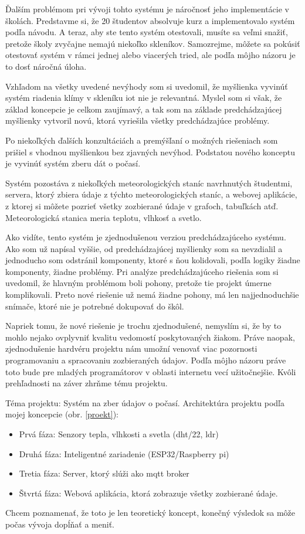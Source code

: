Ďalším problémom pri vývoji tohto systému je náročnosť jeho implementácie v školách. Predstavme si, že 20 študentov absolvuje kurz a implementovalo systém podľa návodu. A teraz, aby ste tento systém otestovali, musíte sa veľmi snažiť, pretože školy zvyčajne nemajú niekoľko skleníkov. Samozrejme, môžete sa pokúsiť otestovať systém v rámci jednej alebo viacerých tried, ale podľa môjho názoru je to dosť náročná úloha. 

Vzhľadom na všetky uvedené nevýhody som si uvedomil, že myšlienka vyvinúť systém riadenia klímy v skleníku \gls{iot} nie je relevantná. Myslel som si však, že základ koncepcie je celkom zaujímavý, a tak som na základe predchádzajúcej myšlienky vytvoril novú, ktorá vyriešila všetky predchádzajúce problémy. 

Po niekoľkých ďalších konzultáciách a premýšľaní o možných riešeniach som prišiel s vhodnou myšlienkou bez zjavných nevýhod. Podstatou nového konceptu je vyvinúť systém zberu dát o počasí.

Systém pozostáva z niekoľkých meteorologických staníc navrhnutých študentmi, servera, ktorý zbiera údaje z týchto meteorologických staníc, a webovej aplikácie, z ktorej si môžete pozrieť všetky zozbierané údaje v grafoch, tabuľkách atď. Meteorologická stanica meria teplotu, vlhkosť a svetlo.

Ako vidíte, tento systém je zjednodušenou verziou predchádzajúceho systému. Ako som už napísal vyššie, od predchádzajúcej myšlienky som sa nevzdialil a jednoducho som odstránil komponenty, ktoré s ňou kolidovali, podľa logiky žiadne komponenty, žiadne problémy. Pri analýze predchádzajúceho riešenia som si uvedomil, že hlavným problémom boli pohony, pretože tie projekt úmerne komplikovali. Preto nové riešenie už nemá žiadne pohony, má len najjednoduchšie snímače, ktoré nie je potrebné dokupovať do škôl. 

Napriek tomu, že nové riešenie je trochu zjednodušené, nemyslím si, že by to mohlo nejako ovplyvniť kvalitu vedomostí poskytovaných žiakom. Práve naopak, zjednodušenie hardvéru projektu nám umožní venovať viac pozornosti programovaniu a spracovaniu zozbieraných údajov. Podľa môjho názoru práve toto bude pre mladých programátorov v oblasti internetu vecí užitočnejšie. 
Kvôli prehľadnosti na záver zhrňme tému projektu.

Téma projektu:  Systém na zber údajov o počasí.
Architektúra projektu podľa mojej koncepcie (obr. \ref{proekt}):
\begin{itemize}
    \item Prvá fáza: Senzory tepla, vlhkosti a svetla (\gls{dht}/22, \gls{ldr})
    \item Druhá fáza: Inteligentné zariadenie (ESP32/Raspberry pi)
    \item Tretia fáza: Server, ktorý slúži ako \gls{mqtt} broker
    \item Štvrtá fáza: Webová aplikácia, ktorá zobrazuje všetky zozbierané údaje.
\end{itemize}
Chcem poznamenať, že toto je len teoretický koncept, konečný výsledok sa môže počas vývoja dopĺňať a meniť.


